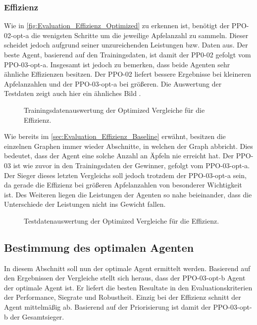 \subsubsection{Effizienz}
Wie in \autoref{fig:Evaluation_Effizienz_Optimized} zu erkennen ist, benötigt der PPO-02-opt-a die wenigsten Schritte um die jeweilige Apfelanzahl zu sammeln. Dieser scheidet jedoch aufgrund seiner unzureichenden Leistungen bzw. Daten aus. Der beste Agent, basierend auf den Trainingsdaten, ist damit der PP0-02 gefolgt vom PPO-03-opt-a. 
Insgesamt ist jedoch zu bemerken, dass beide Agenten sehr ähnliche Effizienzen besitzen. Der PPO-02 liefert bessere Ergebnisse bei kleineren Apfelanzahlen und der PPO-03-opt-a bei größeren. Die Auswertung der Testdaten zeigt auch hier ein ähnliches Bild .
\begin{figure}[H]
\centering

\caption[Effizienz - Auswertung der Trainingsdaten der Optimized Vergleiche]{Trainingsdatenauswertung der Optimized Vergleiche für die Effizienz.}
\label{fig:Evaluation_Effizienz_Optimized}
\end{figure}
 
Wie bereits im \autoref{sec:Evaluation_Effizienz_Baseline} erwähnt, besitzen die einzelnen Graphen immer wieder Abschnitte, in welchen der Graph abbricht. Dies bedeutet, dass der Agent eine solche Anzahl an Äpfeln nie erreicht hat.
Der PPO-03 ist wie zuvor in den Trainingsdaten der Gewinner, gefolgt vom PPO-03-opt-a. Der Sieger dieses letzten Vergleichs soll jedoch trotzdem der PPO-03-opt-a sein, da gerade die Effizienz bei größeren Apfelanzahlen von besonderer Wichtigkeit ist. Des Weiteren liegen die Leistungen der Agenten so nahe beieinander, dass die Unterschiede der Leistungen nicht ins Gewicht fallen.
\begin{figure}[H]
	\centering
	
	\caption[Effizienz - Auswertung der Testdaten der Optimized Vergleiche]{Testdatenauswertung der Optimized Vergleiche für die Effizienz.}
	\label{fig:Evaluation_Effizienz2_Optimized}
\end{figure}

\subsection{Bestimmung des optimalen Agenten} \label{subsec:Evaluation_Bestimmung_optimaler_Agent}
In diesem Abschnitt soll nun der optimale Agent ermittelt werden. Basierend auf den Ergebnissen der Vergleiche stellt sich heraus, dass der PPO-03-opt-b Agent der optimale Agent ist. Er liefert die besten Resultate in den Evaluationskriterien der Performance, Siegrate und Robustheit. Einzig bei der Effizienz schnitt der Agent mittelmäßig ab. Basierend auf der Priorisierung  ist damit der PPO-03-opt-b der Gesamtsieger.

